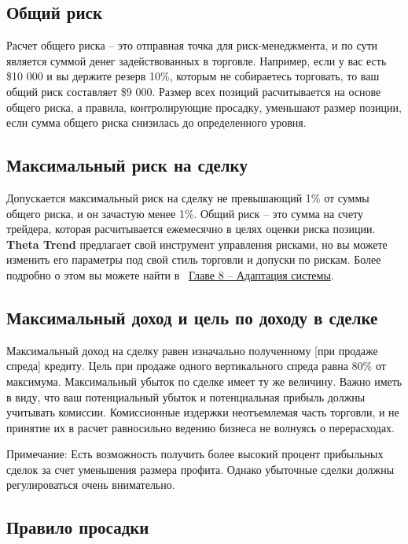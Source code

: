 \documentclass[12pt,DIV=18]{scrartcl}
\begin{document}
\subsection*{Общий риск}

Расчет общего риска -- это отправная точка для риск-менеджмента, и по сути является суммой денег задействованных в торговле. Например, если у вас есть \$10 000 и вы держите резерв 10\%, которым не собираетесь торговать, то ваш общий риск составляет \$9 000. Размер всех позиций расчитывается на основе общего риска, а правила, контролирующие просадку, уменьшают размер позиции, если сумма общего риска снизилась до определенного уровня.

\subsection*{Максимальный риск на сделку}

Допускается максимальный риск на сделку не превышающий 1\% от суммы общего риска, и он зачастую менее 1\%. Общий риск -- это сумма на счету трейдера, которая расчитывается ежемесячно в целях оценки риска позиции. \textbf{Theta Trend} предлагает свой инструмент управления рисками, но вы можете изменить его параметры под свой стиль торговли и допуски по рискам. Более подробно о этом вы можете найти в ~\hyperref[chapter8]{\ul{Главе 8} -- Адаптация системы}.

\subsection*{Максимальный доход и цель по доходу в сделке}

Максимальный доход на сделку равен изначально полученному [при продаже спреда] кредиту. Цель при продаже одного вертикального спреда равна 80\% от максимума. Максимальный убыток по сделке имеет ту же величину. Важно иметь в виду, что ваш потенциальный убыток и потенциальная прибыль должны учитывать комиссии. Комиссионные издержки неотъемлемая часть торговли, и не принятие их в расчет равносильно ведению бизнеса не волнуясь о перерасходах.

\bigskip

Примечание: Есть возможность получить более высокий процент прибыльных сделок за счет уменьшения размера профита. Однако убыточные сделки должны регулироваться очень внимательно.

\subsection*{Правило просадки}
\end{document}
